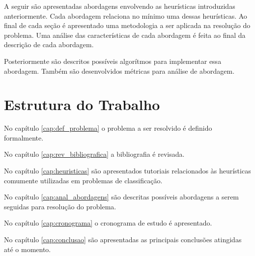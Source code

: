 A seguir são apresentadas abordagens envolvendo as heurísticas introduzidas
anteriormente. Cada abordagem relaciona no mínimo uma dessas heurísticas.
Ao final de cada seção é apresentado uma metodologia a ser aplicada
na resolução do problema. Uma análise das características de cada abordagem
é feita ao final da descrição de cada abordagem.

Posteriormente são descritos possíveis algorítmos para implementar essa abordagem. Também são
desenvolvidos métricas para análise de abordagem.


\section{Estrutura do Trabalho}

No capítulo \ref{cap:def_problema} o problema a ser resolvido é definido formalmente.

No capítulo \ref{cap:rev_bibliografica} a bibliografia é revisada.

No capítulo \ref{cap:heuristicas} são apresentados tutoriais relacionados às
heurísticas comumente utilizadas em problemas de classificação.

No capítulo \ref{cap:anal_abordagens} são descritas possíveis abordagens a serem
seguidas para resolução do problema.

No capítulo \ref{cap:cronograma} o cronograma de estudo é apresentado.

No capítulo \ref{cap:conclusao} são apresentadas as principais conclusões atingidas
até o momento.
